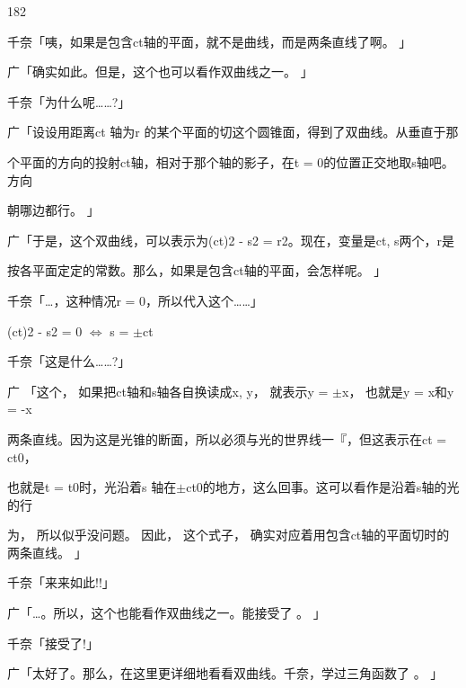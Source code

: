 182\par
千奈「咦，如果是包含ct轴的平面，就不是曲线，而是两条直线了啊。 」\par
广「确实如此。但是，这个也可以看作双曲线之一。 」\par
千奈「为什么呢……?」\par
广「设设用距离ct 轴为r 的某个平面的切这个圆锥面，得到了双曲线。从垂直于那\par
个平面的方向的投射ct轴，相对于那个轴的影子，在t = 0的位置正交地取s轴吧。方向\par
朝哪边都行。 」\par
广「于是，这个双曲线，可以表示为(ct)2 - s2 = r2。现在，变量是ct, s两个，r是\par
按各平面定定的常数。那么，如果是包含ct轴的平面，会怎样呢。 」\par
千奈「…，这种情况r = 0，所以代入这个……」\par
(ct)2 - s2 = 0 $\Leftrightarrow$ s = $\pm$ct\par
千奈「这是什么……?」\par
广 「这个， 如果把ct轴和s轴各自换读成x, y， 就表示y = $\pm$x， 也就是y = x和y = -x\par
两条直线。因为这是光锥的断面，所以必须与光的世界线一『，但这表示在ct = ct0，\par
也就是t = t0时，光沿着s 轴在$\pm$ct0的地方，这么回事。这可以看作是沿着s轴的光的行\par
为， 所以似乎没问题。 因此， 这个式子， 确实对应着用包含ct轴的平面切时的两条直线。 」\par
千奈「来来如此!!」\par
广「…。所以，这个也能看作双曲线之一。能接受了 。 」\par
千奈「接受了!」\par
广「太好了。那么，在这里更详细地看看双曲线。千奈，学过三角函数了 。 」\par

